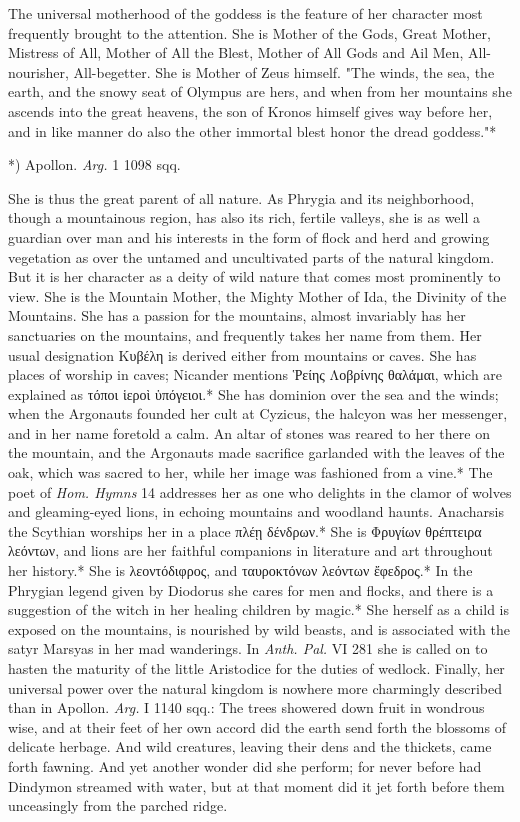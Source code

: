 \documentclass[a4paper, 11pt, oneside, polutonikogreek, english]{article}
\begin{document}
The universal motherhood of the goddess is the feature of her character most frequently brought to the attention. She is Mother of the Gods, Great Mother, Mistress of All, Mother of All the Blest, Mother of All Gods and Ail Men, All-nourisher, All-begetter. She is Mother of Zeus himself. "The winds, the sea, the earth, and the snowy seat of Olympus are hers, and when from her mountains she ascends into the great heavens, the son of Kronos himself gives way before her, and in like manner do also the other immortal blest honor the dread goddess."*

*) Apollon. \emph{Arg.} 1 1098 sqq.

She is thus the great parent of all nature. As Phrygia and its neighborhood, though a mountainous region, has also its rich, fertile valleys, she is as well a guardian over man and his interests in the form of flock and herd and growing vegetation as over the untamed and uncultivated parts of the natural kingdom. But it is her character as a deity of wild nature that comes most prominently to view. She is the Mountain Mother, the Mighty Mother of Ida, the Divinity of the Mountains. She has a passion for the mountains, almost invariably has her sanctuaries on the mountains, and frequently takes her name from them. Her usual designation Κυβέλη is derived either from mountains or caves. She has places of worship in caves; Nicander mentions Ῥείης Λοβρίνης θαλάμαι, which are explained as τόποι ἱεροὶ ὑπόγειοι.* She has dominion over the sea and the winds; when the Argonauts founded her cult at Cyzicus, the halcyon was her messenger, and in her name foretold a calm. An altar of stones was reared to her there on the mountain, and the Argonauts made sacrifice garlanded with the leaves of the oak, which was sacred to her, while her image was fashioned from a vine.* The poet of \emph{Hom. Hymns} 14 addresses her as one who delights in the clamor of wolves and gleaming-eyed lions, in echoing mountains and woodland haunts. Anacharsis the Scythian worships her in a place πλέῃ δένδρων.* She is Φρυγίων θρέπτειρα λεόντων, and lions are her faithful companions in literature and art throughout her history.* She is λεοντόδιφρος, and ταυροκτόνων λεόντων ἔφεδρος.* In the Phrygian legend given by Diodorus she cares for men and flocks, and there is a suggestion of the witch in her healing children by magic.* She herself as a child is exposed on the mountains, is nourished by wild beasts, and is associated with the satyr Marsyas in her mad wanderings. In \emph{Anth. Pal.} VI 281 she is called on to hasten the maturity of the little Aristodice for the duties of wedlock. Finally, her universal power over the natural kingdom is nowhere more charmingly described than in Apollon. \emph{Arg.} I 1140 sqq.: The trees showered down fruit in wondrous wise, and at their feet of her own accord did the earth send forth the blossoms of delicate herbage. And wild creatures, leaving their dens and the thickets, came forth fawning. And yet another wonder did she perform; for never before had Dindymon streamed with water, but at that moment did it jet forth before them unceasingly from the parched ridge.
\end{document}
